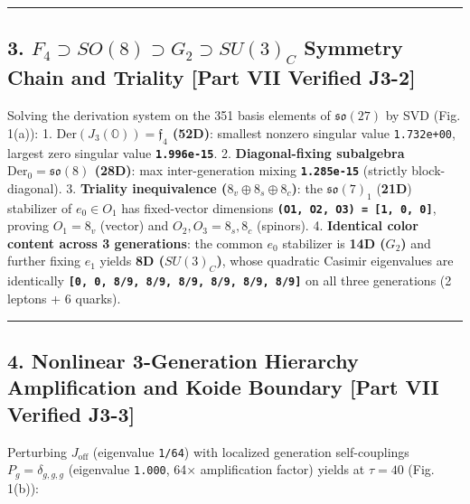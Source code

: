 \documentclass[
  a4paper,
]{article}
\begin{document}
\begin{center}\rule{0.5\linewidth}{0.5pt}\end{center}

\subsection{\texorpdfstring{3.
\(F_4 \supset SO(8) \supset G_2 \supset SU(3)_C\) Symmetry Chain and
Triality {[}Part VII Verified
J3-2{]}}{3. F\_4 \textbackslash supset SO(8) \textbackslash supset G\_2 \textbackslash supset SU(3)\_C Symmetry Chain and Triality {[}Part VII Verified J3-2{]}}}\label{f_4-supset-so8-supset-g_2-supset-su3_c-symmetry-chain-and-triality-part-vii-verified-j3-2}

Solving the derivation system on the 351 basis elements of
\(\mathfrak{so}(27)\) by SVD (Fig. 1(a)): 1.
\textbf{\(\mathrm{Der}(J_3(\mathbb{O})) = \mathfrak{f}_4\) (52D)}:
smallest nonzero singular value \texttt{1.732e+00}, largest zero
singular value \textbf{\texttt{1.996e-15}}. 2. \textbf{Diagonal-fixing
subalgebra \(\mathrm{Der}_0 = \mathfrak{so}(8)\) (28D)}: max
inter-generation mixing \textbf{\texttt{1.285e-15}} (strictly
block-diagonal). 3. \textbf{Triality inequivalence
(\(8_v \oplus 8_s \oplus 8_c\))}: the \(\mathfrak{so}(7)_1\)
(\textbf{21D}) stabilizer of \(e_0 \in O_1\) has fixed-vector dimensions
\textbf{\texttt{(O1,\ O2,\ O3)\ =\ {[}1,\ 0,\ 0{]}}}, proving
\(O_1 = 8_v\) (vector) and \(O_2, O_3 = 8_s, 8_c\) (spinors). 4.
\textbf{Identical color content across 3 generations}: the common
\(e_0\) stabilizer is \textbf{14D (\(G_2\))} and further fixing \(e_1\)
yields \textbf{8D (\(SU(3)_C\))}, whose quadratic Casimir eigenvalues
are identically
\textbf{\texttt{{[}0,\ 0,\ 8/9,\ 8/9,\ 8/9,\ 8/9,\ 8/9,\ 8/9{]}}} on all
three generations (2 leptons + 6 quarks).

\begin{center}\rule{0.5\linewidth}{0.5pt}\end{center}

\subsection{4. Nonlinear 3-Generation Hierarchy Amplification and Koide
Boundary {[}Part VII Verified
J3-3{]}}\label{nonlinear-3-generation-hierarchy-amplification-and-koide-boundary-part-vii-verified-j3-3}

Perturbing \(J_{\mathrm{off}}\) (eigenvalue \texttt{1/64}) with
localized generation self-couplings \(P_g = \delta_{g,g,g}\) (eigenvalue
\texttt{1.000}, 64× amplification factor) yields at \(\tau = 40\) (Fig.
1(b)):
\end{document}
